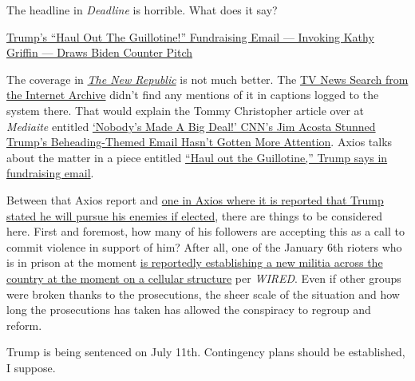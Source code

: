 The headline in \emph{Deadline} is horrible. What does it say?

\href{https://web.archive.org/web/20240613001814/https://deadline.com/2024/06/trump-guillotine-kathy-griffin-1235971973/}{Trump's
``Haul Out The Guillotine!'' Fundraising Email --- Invoking Kathy
Griffin --- Draws Biden Counter Pitch}

The coverage in
\href{https://web.archive.org/web/20240613052045/https://newrepublic.com/post/182620/trump-message-followers-dark-turn-guillotine}{\emph{The
New Republic}} is not much better. The
\href{https://archive.org/details/tv?q=trump+guillotine&and\%5B\%5D=publicdate\%3A\%5B2009-06-04+TO+2024-06-13\%5D&red=1&sort=-addeddate}{TV
News Search from the Internet Archive} didn't find any mentions of it in
captions logged to the system there. That would explain the Tommy
Christopher article over at \emph{Mediaite} entitled
\href{https://web.archive.org/web/20240612211506/https://www.mediaite.com/news/nobodys-made-a-big-deal-cnns-jim-acosta-stunned-trumps-beheading-themed-email-hasnt-gotten-more-attention/}{`Nobody's
Made A Big Deal!' CNN's Jim Acosta Stunned Trump's Beheading-Themed
Email Hasn't Gotten More Attention}. Axios talks about the matter in a
piece entitled
\href{https://web.archive.org/web/20240613032346/https://www.axios.com/2024/06/12/trump-guillotine-fundraising-email-democrats}{``Haul
out the Guillotine,'' Trump says in fundraising email}.

Between that Axios report and
\href{https://web.archive.org/web/20240607223852/https://www.axios.com/2024/06/06/trump-hannity-biden-prosecution-fox-news}{one
in Axios where it is reported that Trump stated he will pursue his
enemies if elected}, there are things to be considered here. First and
foremost, how many of his followers are accepting this as a call to
commit violence in support of him? After all, one of the January 6th
rioters who is in prison at the moment
\href{https://web.archive.org/web/20240612203847/https://www.wired.com/story/january-6-rioter-leading-armed-national-militia-from-prison/}{is
reportedly establishing a new militia across the country at the moment
on a cellular structure} per \emph{WIRED}. Even if other groups were
broken thanks to the prosecutions, the sheer scale of the situation and
how long the prosecutions has taken has allowed the conspiracy to
regroup and reform.

Trump is being sentenced on July 11th. Contingency plans should be
established, I suppose.
